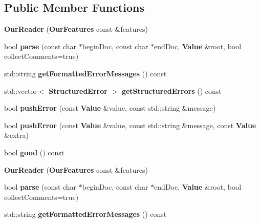 \subsection*{Public Member Functions}
\begin{DoxyCompactItemize}
\item 
{\bfseries Our\+Reader} ({\bf Our\+Features} const \&features)\label{class_json_1_1_our_reader_a48a850914b9c8d7781be172930c478e5}

\item 
bool {\bfseries parse} (const char $\ast$begin\+Doc, const char $\ast$end\+Doc, {\bf Value} \&root, bool collect\+Comments=true)\label{class_json_1_1_our_reader_aba4f8749aab7f02ec17f107e392caf80}

\item 
std\+::string {\bfseries get\+Formatted\+Error\+Messages} () const \label{class_json_1_1_our_reader_ae9cbb7dbd9c6c96be37432e8dfa1afcb}

\item 
std\+::vector$<$ {\bf Structured\+Error} $>$ {\bfseries get\+Structured\+Errors} () const \label{class_json_1_1_our_reader_a02ef7871af3706754a233c36e6d489e9}

\item 
bool {\bfseries push\+Error} (const {\bf Value} \&value, const std\+::string \&message)\label{class_json_1_1_our_reader_aef7aa4ca22ffaa38c401b16951d20e1e}

\item 
bool {\bfseries push\+Error} (const {\bf Value} \&value, const std\+::string \&message, const {\bf Value} \&extra)\label{class_json_1_1_our_reader_ad43315cbb0d6804e3b7177e84a1ec53d}

\item 
bool {\bfseries good} () const \label{class_json_1_1_our_reader_a048346238d703ad9aed06beb686e6102}

\item 
{\bfseries Our\+Reader} ({\bf Our\+Features} const \&features)\label{class_json_1_1_our_reader_a48a850914b9c8d7781be172930c478e5}

\item 
bool {\bfseries parse} (const char $\ast$begin\+Doc, const char $\ast$end\+Doc, {\bf Value} \&root, bool collect\+Comments=true)\label{class_json_1_1_our_reader_aba4f8749aab7f02ec17f107e392caf80}

\item 
std\+::string {\bfseries get\+Formatted\+Error\+Messages} () const \label{class_json_1_1_our_reader_ae9cbb7dbd9c6c96be37432e8dfa1afcb}


\end{DoxyCompactItemize}
